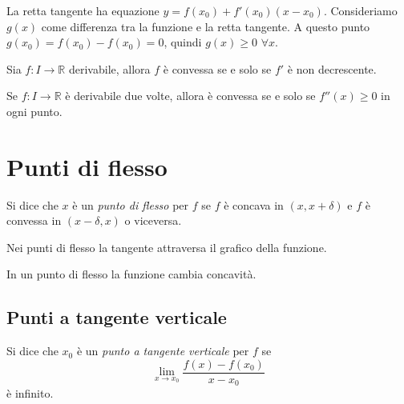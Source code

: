 La retta tangente ha equazione $y = f(x_0)+f'(x_0)(x-x_0)$. Consideriamo $g(x)$ come differenza tra la funzione e la retta tangente. A questo punto $g(x_0) = f(x_0) - f(x_0) = 0$, quindi $g(x) \ge 0$ $\forall x$.


Sia $f: I \to \mathbb{R}$ derivabile, allora $f$ è convessa se e solo se $f'$ è non decrescente.

Se $f: I \to \mathbb{R}$ è derivabile due volte, allora è convessa se e solo se $f''(x) \ge 0$ in ogni punto.

\section{Punti di flesso}

Si dice che $x$ è un \emph{punto di flesso} per $f$ se $f$ è concava in $(x, x + \delta)$ e $f$ è convessa in $(x-\delta, x)$ o viceversa.

Nei punti di flesso la tangente attraversa il grafico della funzione.

In un punto di flesso la funzione cambia concavità.

\subsection{Punti a tangente verticale}

Si dice che $x_0$ è un \emph{punto a tangente verticale} per $f$ se
\begin{equation*}
\lim_{x \to x_0} \frac{f(x)-f(x_0)}{x-x_0}
\end{equation*}
è infinito.
